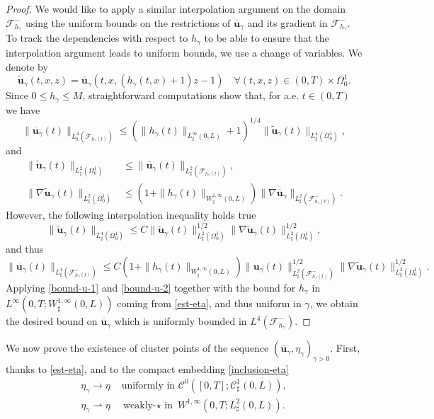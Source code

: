 \documentclass[10pt]{amsart}
\let\mathcal\mathscr
\theoremstyle{remark}
\theoremstyle{definition}
\newcommand{\ug}{\boldsymbol{u}}
\begin{document}
\begin{proof}
We would like to apply a similar interpolation argument on the domain $\mathcal F_{h_{\gamma}}^{-}$ using the uniform bounds on the restrictions of $\overline{\ug}_{\gamma}$ and its gradient in $\mathcal F_{h_{\gamma}}^{-}$. To track the dependencies with respect to $h_{\gamma}$ to be able to ensure that the interpolation argument leads to uniform bounds, we use a change of variables. We denote by
\[
\tilde{\ug}_{\gamma}(t,x,z) = \overline{\ug}_{\gamma}(t,x,(h_{\gamma}(t,x) + 1)z - 1 ) \quad \forall (t,x,z) \in (0,T) \times \Omega_0^1.
\]
Since $0 \leq h_{\gamma} \leq M$, straightforward computations show that, for a.e. $t \in (0,T)$ we have
\[
\|\overline{\ug}_{\gamma}(t)\|_{L_\sharp^4(\mathcal F_{h_{\gamma}(t)})} \leq (\|h_{\gamma}(t)\|_{L^{\infty}_{\sharp}(0,L)}+1)^{1/4} \|\tilde{\ug}_{\gamma}(t)\|_{L_\sharp^4( \Omega_0^1)},
\]
and
\begin{align*}
\|\tilde{\ug}_{\gamma}(t)\|_{L_\sharp^2( \Omega_0^1)} & \leq \|\overline{\ug}_{\gamma}(t)\|_{L_\sharp^2(\mathcal F_{h_{\gamma}(t)})}, \\
\|\nabla \tilde{\ug}_{\gamma}(t)\|_{L_\sharp^2( \Omega_0^1)} & \leq (1+ \|h_{\gamma}(t)\|_{W^{1,\infty}_{\sharp}(0,L)}) \|\nabla \overline{\ug}_{\gamma}\|_{L_\sharp^2(\mathcal F^-_{h_{\gamma}(t)})}.
\end{align*}
However, the following interpolation inequality holds true
\[
\|\tilde{\ug}_{\gamma}(t)\|_{L_\sharp^4( \Omega_0^1)} \leq C \|\tilde{\ug}_{\gamma}(t)\|^{1/2}_{L_\sharp^2( \Omega_0^1)}\|\nabla \tilde{\ug}_{\gamma}(t)\|^{1/2}_{L_\sharp^2( \Omega_0^1)},
\]
and thus
\[
\|\overline{\ug}_{\gamma}(t)\|_{L_\sharp^4(\mathcal F^{-}_{h_{\gamma}(t)})} \leq C(1+ \|h_{\gamma}(t)\|_{W^{1,\infty}_{\sharp}(0,L)}) \|{\ug}_{\gamma}(t)\|^{1/2}_{L_\sharp^2(\mathcal F^{-}_{h_{\gamma}(t)})}\|\nabla \tilde{\ug}_{\gamma}(t)\|^{1/2}_{L_\sharp^2(\Omega_0^1)}.
\]
Applying \eqref{bound-u-1} and \eqref{bound-u-2} together with the bound for
$h_{\gamma}$ in $L^{\infty}(0,T;W^{1,\infty}_{\sharp}(0,L))$ coming from \eqref{est-eta}, and thus uniform in $\gamma$, we obtain the desired bound on $\overline{\ug}_{\gamma}$ which is uniformly bounded in $L^4(\mathcal F^{-}_{h_{\gamma}})$. \end{proof}

We now prove the existence of cluster points of the sequence $(\overline{\ug}_{\gamma},\eta_{\gamma})_{\gamma >0}$. First, thanks to \eqref{est-eta}, and to the compact embedding \eqref{inclusion-eta}
\[
\begin{split}\textstyle
\eta_{\gamma}\to\eta& \text{ uniformly in }\mathcal{C}^{0}([0,T];\mathcal{C}^{1}_{\sharp}(0,L)),\\
\eta_{\gamma}\rightharpoonup\eta& \text{ weakly-$\star$ in }W^{1,\infty}(0,T;L^2_{\sharp}(0,L)).
\end{split}
\]
\end{document}
